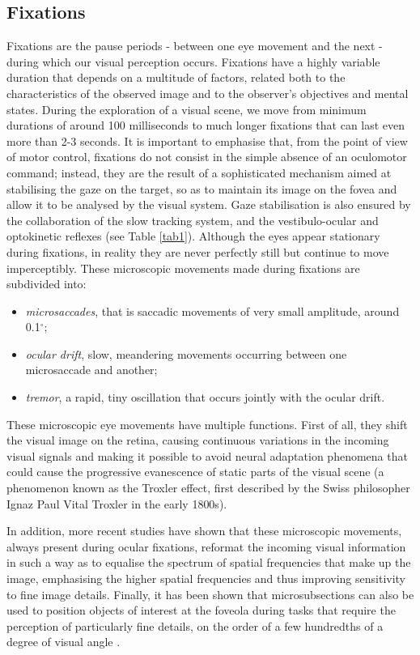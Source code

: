 \documentclass[11pt]{article}
\begin{document}
\subsection{Fixations}
Fixations are the pause periods - between one eye movement and the next - during which our visual perception occurs. Fixations have a highly variable duration that depends on a multitude of factors, related both to the characteristics of the observed image and to the observer's objectives and mental states. During the exploration of a visual scene, we move from minimum durations of around 100 milliseconds to much longer fixations that can last even more than 2-3 seconds. It is important to emphasise that, from the point of view of motor control, fixations do not consist in the simple absence of an oculomotor command; instead, they are the result of a sophisticated mechanism aimed at stabilising the gaze on the target, so as to maintain its image on the fovea and allow it to be analysed by the visual system. Gaze stabilisation is also ensured by the collaboration of the slow tracking system, and the vestibulo-ocular and optokinetic reflexes (see Table \ref{tab1}).
Although the eyes appear stationary during fixations, in reality they are never perfectly still but continue to move imperceptibly. These microscopic movements made during fixations are subdivided into:
\begin{itemize}
\item \textit{microsaccades}, that is saccadic movements of very small amplitude, around 0.1$^{\circ}$;
\item \textit{ocular drift},  slow, meandering movements occurring between one microsaccade and another;
\item \textit{tremor},  a rapid, tiny oscillation that occurs jointly with the ocular drift.
\end{itemize}
These microscopic eye movements have multiple functions. First of all, they shift the visual image on the retina, causing continuous variations in the incoming visual signals and making it possible to avoid neural adaptation phenomena that could cause the progressive evanescence of static parts of the visual scene (a phenomenon known as the Troxler effect, first described by the Swiss philosopher Ignaz Paul Vital Troxler in the early 1800s).

In addition, more recent studies have shown that these microscopic movements, always present during ocular fixations, reformat the incoming visual information in such a way as to equalise the spectrum of spatial frequencies that make up the image, emphasising the higher spatial frequencies \cite{Rucci2015} and thus improving sensitivity to fine image details. Finally, it has been shown that microsubsections can also be used to position objects of interest at the foveola during tasks that require the perception of particularly fine details, on the order of a few hundredths of a degree of visual angle \cite{Ko2010a,Rucci2007}.
\end{document}

